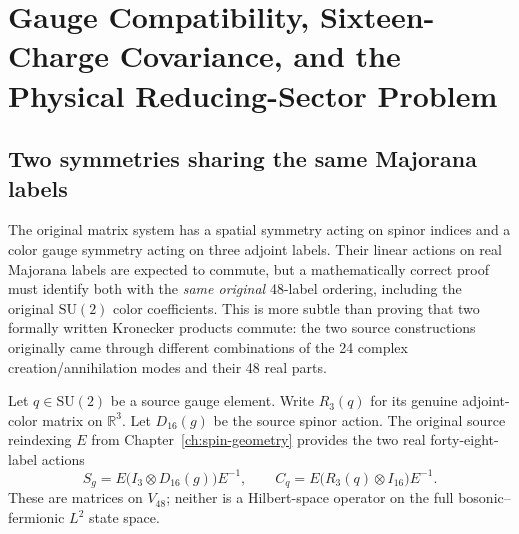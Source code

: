 \chapter[Gauge Compatibility and Physical Sector Reduction]{Gauge Compatibility, Sixteen-Charge Covariance, and the Physical Reducing-Sector Problem}
\label{ch:covariance}

\section{Two symmetries sharing the same Majorana labels}
The original matrix system has a spatial symmetry acting on spinor
indices and a color gauge symmetry acting on three adjoint labels.
Their linear actions on real Majorana labels are expected to commute,
but a mathematically correct proof must identify both with the
\emph{same original} 48-label ordering, including the original
$\mathrm{SU}(2)$ color coefficients. This is more subtle than proving
that two formally written Kronecker products commute: the two source
constructions originally came through different combinations of the
24 complex creation/annihilation modes and their 48 real parts.

Let $q\in\mathrm{SU}(2)$ be a source gauge element. Write
$R_3(q)$ for its genuine adjoint-color matrix on
$\mathbb R^3$. Let $D_{16}(g)$ be the source spinor action.
The original source reindexing $E$ from Chapter~\ref{ch:spin-geometry}
provides the two real forty-eight-label actions
\begin{equation}\label{eq:spatial-vs-color-labels}
 S_g=E\bigl(I_3\otimes D_{16}(g)\bigr)E^{-1},\qquad
 C_q=E\bigl(R_3(q)\otimes I_{16}\bigr)E^{-1}.
\end{equation}
These are matrices on $V_{48}$; neither is a Hilbert-space operator
on the full bosonic--fermionic $L^2$ state space.

